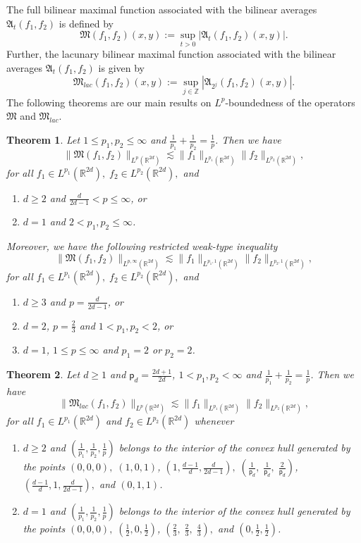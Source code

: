 \documentclass[a4paper,reqno]{amsart}
\newtheorem{theorem}{Theorem}[section]
\theoremstyle{definition}
\theoremstyle{remark}
\numberwithin{equation}{section}
\newcommand{\R}{{\mathbb {R}}}
\newcommand{\Z}{{\mathbb Z}}
\begin{document}
	The full bilinear maximal function associated with the bilinear averages $\mathfrak{A}_t(f_1,f_2)$ is defined by
	\[\mathfrak{M}(f_1,f_2)(x,y):=\sup_{t>0}\left|\mathfrak{A}_t(f_1,f_2)(x,y)\right|.\]
	Further, the lacunary bilinear maximal function associated with the bilinear averages $\mathfrak{A}_t(f_1,f_2)$ is given by
	\[\mathfrak{M}_{lac}(f_1,f_2)(x,y):=\sup_{j\in\Z}\left|\mathfrak{A}_{2^j}(f_1,f_2)(x,y)\right|.\]
	The following theorems are our main results on $L^p$-boundedness of the operators $\mathfrak{M}$ and $\mathfrak{M}_{lac}.$
	\begin{theorem}\label{full}
		Let $1\leq p_1,p_2\leq \infty$ and $\frac{1}{p_1}+\frac{1}{p_2}=\frac{1}{p}$. Then we have
		\[\|\mathfrak{M}(f_1,f_2)\|_{L^p(\R^{2d})}\lesssim \|f_1\|_{L^{p_1}(\R^{2d})}\|f_2\|_{L^{p_2}(\R^{2d})},\]
		for all $f_1\in L^{p_1}(\R^{2d}),\;f_2\in L^{p_2}(\R^{2d}),$ and
		\begin{enumerate}
			\item $d\geq2$ and $\frac{d}{2d-1}<p\leq\infty$, or
			\item $d=1$ and $2<p_1,p_2\leq\infty$.
		\end{enumerate}
		Moreover, we have the following restricted weak-type inequality
		\[\|\mathfrak{M}(f_1,f_2)\|_{L^{p,\infty}(\R^{2d})}\lesssim \|f_1\|_{L^{p_1,1}(\R^{2d})}\|f_2\|_{L^{p_2,1}(\R^{2d})},\]
		for all $f_1\in L^{p_1}(\R^{2d}),\;f_2\in L^{p_2}(\R^{2d}),$ and
		\begin{enumerate}
			\item $d\geq3$ and $p=\frac{d}{2d-1}$, or
			\item $d=2$, $p=\frac{2}{3}$ and $1< p_1,p_2<2$, or
			\item $d=1$, $1\leq p\leq\infty$ and $p_1=2$ or $p_2=2$.
		\end{enumerate}
	\end{theorem}
	\begin{theorem}\label{lacunary}
		Let $d\geq1$ and $\mathsf{p}_d=\frac{2d+1}{2d}$, $1<p_1,p_2<\infty$ and $\frac{1}{p_1}+\frac{1}{p_2}=\frac{1}{p}$. Then we have
		\[\|\mathfrak{M}_{lac}(f_1,f_2)\|_{L^p(\R^{2d})}\lesssim \|f_1\|_{L^{p_1}(\R^{2d})}\|f_2\|_{L^{p_2}(\R^{2d})},\]
		for all $f_1\in L^{p_1}(\R^{2d})$ and $f_2\in L^{p_2}(\R^{2d})$ whenever
		\begin{enumerate}
			\item $d\geq2$ and $\left(\frac{1}{p_1},\frac{1}{p_2},\frac{1}{p}\right)$ belongs to the interior of the convex hull generated by the points $(0,0,0),\;(1,0,1)$, $\left(1,\frac{d-1}{d},\frac{d}{2d-1}\right),\;\left(\frac{1}{\mathsf{p}_d},\;\frac{1}{\mathsf{p}_d},\;\frac{2}{\mathsf{p}_d}\right)$, $\left(\frac{d-1}{d},1,\frac{d}{2d-1}\right),$ and $(0,1,1)$.
			\item $d=1$ and $\left(\frac{1}{p_1},\frac{1}{p_2},\frac{1}{p}\right)$ belongs to the interior of the convex hull generated by the points $(0,0,0),\;\left(\frac{1}{2},0,\frac{1}{2}\right)$, $\left(\frac{2}{3},\;\frac{2}{3},\;\frac{4}{3}\right),$ and $\left(0,\frac{1}{2},\frac{1}{2}\right)$.
		\end{enumerate}
	\end{theorem}
\end{document}
